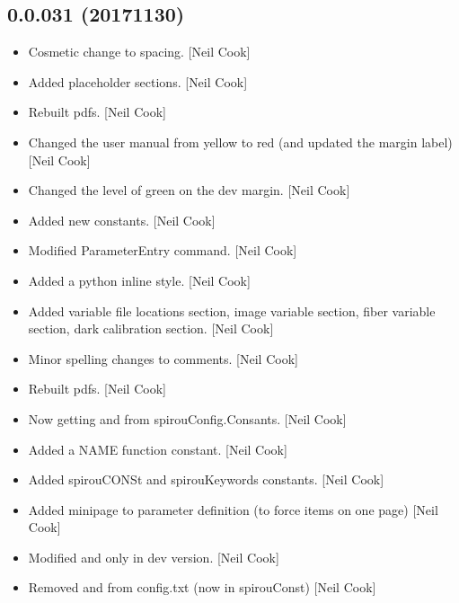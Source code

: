 \documentclass[a4paper,10pt,english]{report}
\begin{document}
\subsection{0.0.031 (2017\sphinxhyphen{}11\sphinxhyphen{}30)}
\label{\detokenize{misc/changelog:id539}}\begin{itemize}
\item {} 
Cosmetic change to spacing. {[}Neil Cook{]}

\item {} 
Added placeholder sections. {[}Neil Cook{]}

\item {} 
Rebuilt pdfs. {[}Neil Cook{]}

\item {} 
Changed the user manual from yellow to red (and updated the margin
label) {[}Neil Cook{]}

\item {} 
Changed the level of green on the dev margin. {[}Neil Cook{]}

\item {} 
Added new constants. {[}Neil Cook{]}

\item {} 
Modified ParameterEntry command. {[}Neil Cook{]}

\item {} 
Added a python inline style. {[}Neil Cook{]}

\item {} 
Added variable file locations section, image variable section, fiber
variable section, dark calibration section. {[}Neil Cook{]}

\item {} 
Minor spelling changes to comments. {[}Neil Cook{]}

\item {} 
Rebuilt pdfs. {[}Neil Cook{]}

\item {} 
Now getting  and  from spirouConfig.Consants. {[}Neil
Cook{]}

\item {} 
Added a NAME function constant. {[}Neil Cook{]}

\item {} 
Added spirouCONSt and spirouKeywords constants. {[}Neil Cook{]}

\item {} 
Added minipage to parameter definition (to force items on one page)
{[}Neil Cook{]}

\item {} 
Modified  and  \sphinxhyphen{} only in dev version. {[}Neil Cook{]}

\item {} 
Removed  and  from config.txt (now in spirouConst)
{[}Neil Cook{]}

\end{itemize}
\end{document}
